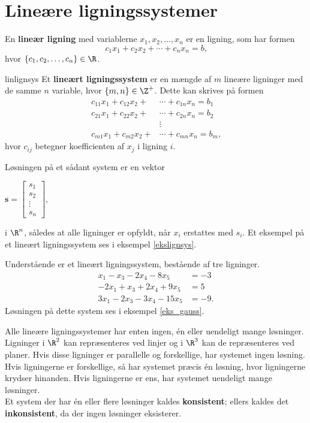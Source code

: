 \section{Lineære ligningssystemer }
%
En \textbf{lineær ligning} med variablerne $x_1,x_2,\ldots ,x_n$ er en ligning, som har formen
$$ c_1x_1+c_2x_2+\cdots+c_nx_n=b \text{,}$$ 
hvor $\{c_1,c_2,\ldots,c_n\} \in \R$. 
%
\begin{defn}{}{linlignsys}
Et \textbf{lineært ligningssystem} er en mængde af $m$ lineære ligninger med de samme $n$ variable, hvor $\{m, n\} \in \Z^+$.
Dette kan skrives på formen
\begin{align*}
c_{11}x_1+c_{12}x_2+&\cdots+c_{1n}x_n=b_1\\
c_{21}x_1+c_{22}x_2+&\cdots+c_{2n}x_n=b_2\\
&\vdots\\
c_{m1}x_1+c_{m2}x_2+&\cdots +c_{mn}x_n=b_m
\text{,}
\end{align*}
hvor $c_{ij}$ betegner koefficienten af $x_j$ i ligning $i$.
\end{defn}
\noindent
Løsningen på et sådant system er en vektor
\begin{center}
$
\mathbf{s} = 
\begin{bmatrix}
s_1\\
s_2\\
\vdots\\
s_n
\end{bmatrix},
$
\end{center}
i $\R ^n$, således at alle ligninger er opfyldt, når $x_i$ erstattes med $s_i$. Et eksempel på et lineært ligningssystem ses i eksempel \ref{ekslignsys}.
%
\\
\begin{eks}
\label{ekslignsys}
Understående er et lineært ligningssystem, bestående af tre ligninger.
%
\begin{align*}
x_1-x_3-2x_4-8x_5&=-3 \\
-2x_1+x_3+2x_4+9x_5&=5 \\
3x_1-2x_3-3x_4-15x_5&=-9.
\end{align*}
%
Løsningen på dette system ses i eksempel \ref{eks_gauss}.
%
%
\end{eks}
Alle lineære ligningssystemer har enten ingen, én eller uendeligt mange løsninger.
Ligninger i $\R^2$ kan repræsenteres ved linjer og i $\R^3$ kan de repræsenteres ved planer.
Hvis disse ligninger er parallelle og forskellige, har systemet ingen løsning.
Hvis ligningerne er forskellige, så har systemet præcis én løsning, hvor ligningerne krydser hinanden. 
Hvis ligningerne er ens, har systemet uendeligt mange løsninger.\\
Et system der har én eller flere løsninger kaldes \textbf{konsistent}; ellers kaldes det \textbf{inkonsistent}, da der ingen løsninger eksisterer.
%
%
%
